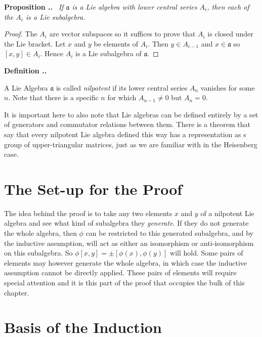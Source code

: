 \documentclass[honours]{UNSWthesis}
\newcommand{\1}{\mathbf{e}_{1}}
\newcommand{\2}{\mathbf{e}_{3}}
\newcommand{\3}{\mathbf{e}_{3}}
\newcounter{Item}[section]
\newenvironment{Definition}{\medskip
                            \refstepcounter{Item}
                            \noindent
                           {\bf Definition \thesection.\theItem.}\ }
                           {\medskip}
\newenvironment{Proposition}{\medskip
                            \refstepcounter{Item}
                            \noindent
                           {\bf Proposition \thesection.\theItem.}\ %
                            \begingroup \sl}
                           {\endgroup\medskip}
\begin{document}
\begin{Proposition}
If $\mathfrak{a}$ is a Lie algebra with lower central series $A_{i}$, then each of the $A_{i}$ is a Lie subalgebra. 
\end{Proposition}

\begin{proof}
The $A_{i}$ are vector subspaces so it suffices to prove that $A_{i}$ is closed under the Lie bracket. Let $x$ and $y$ be elements of $A_{i}$. Then $y \in A_{i-1}$ and $x \in \mathfrak{a}$ so $[x,y] \in A_{i}$. Hence $A_{i}$ is a Lie subalgebra of $\mathfrak{a}$.
\end{proof}

\begin{Definition}\label{nilp lie alg}

A Lie Algebra $\mathfrak{a}$ is called \emph{nilpotent} if its lower central series $A_{n}$ vanishes for some $n$. \newline
Note that there is a specific $n$ for which $A_{n-1} \neq 0$ but $A_{n} =0$.
\end{Definition}

It is important here to also note that Lie algebras can be defined entirely by a set of generators and commutator relations between them. There is a theorem that say that every nilpotent Lie algebra defined this way has a representation as s group of upper-triangular matrices, just as we are familiar with in the Heisenberg case. 

\section{The Set-up for the Proof}


The idea behind the proof is to take any two elements $x$ and $y$ of a nilpotent Lie algebra and see what kind of subalgebra they \emph{generate}. 
If they do not generate the whole algebra, then $\phi$ can be restricted to this generated subalgebra, and by the inductive assumption, will act as either an isomorphism or anti-isomorphism on this subalgebra. So $\phi[x,y]=\pm[\phi(x),\phi(y)]$ will hold. Some pairs of elements may however generate the whole algebra, in which case the inductive assumption cannot be directly applied. These pairs of elements will require special attention and it is this part of the proof that occupies the bulk of this chapter. 

\section{Basis of the Induction}
\end{document}
